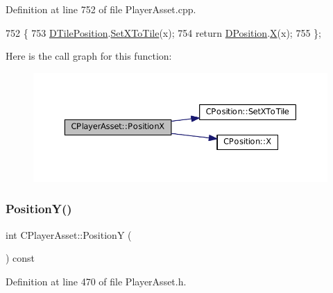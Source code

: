 Definition at line 752 of file Player\+Asset.\+cpp.


\begin{DoxyCode}
752                                 \{
753     \hyperlink{classCPlayerAsset_a5b59a9d3b7db8c7fa194b80dafb96186}{DTilePosition}.\hyperlink{classCPosition_a12795d06d34e608697b7b4c9bf202a10}{SetXToTile}(x);
754     \textcolor{keywordflow}{return} \hyperlink{classCPlayerAsset_aa9f53c009b181c7c5647c6b03776a04c}{DPosition}.\hyperlink{classCPosition_a9a6b94d3b91df1492d166d9964c865fc}{X}(x);
755 \};
\end{DoxyCode}
Here is the call graph for this function\+:
\nopagebreak
\begin{figure}[H]
\begin{center}
\leavevmode
\includegraphics[width=350pt]{classCPlayerAsset_a3b0981638b2e86e1ffb211365db26b41_cgraph}
\end{center}
\end{figure}
\hypertarget{classCPlayerAsset_a4f70846298e9951489ef138847c268a5}{}\label{classCPlayerAsset_a4f70846298e9951489ef138847c268a5} 
\subsubsection{\texorpdfstring{Position\+Y()}{PositionY()}\hspace{0.1cm}{\footnotesize\ttfamily [1/2]}}
{\footnotesize\ttfamily int C\+Player\+Asset\+::\+PositionY (\begin{DoxyParamCaption}{ }\end{DoxyParamCaption}) const\hspace{0.3cm}{\ttfamily [inline]}}



Definition at line 470 of file Player\+Asset.\+h.


